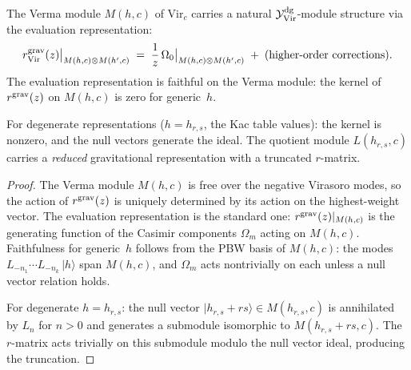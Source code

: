 \begin{proposition}
\label{prop:thqg-V-verma-gravitational}
The Verma module $M(h,c)$ of $\mathrm{Vir}_c$ carries a natural
$\mathcal{Y}^{\mathrm{dg}}_{\mathrm{Vir}}$-module structure via the evaluation
representation:
\begin{equation}\label{eq:thqg-V-verma-evaluation}
r^{\mathrm{grav}}_{\mathrm{Vir}}(z)\big|_{M(h,c) \otimes M(h',c)}
\;=\;
\frac{1}{z}\,\Omega_0\big|_{M(h,c) \otimes M(h',c)}
\;+\;
\text{(higher-order corrections)}.
\end{equation}
The evaluation representation is faithful on the Verma module:
the kernel of $r^{\mathrm{grav}}(z)$ on $M(h,c)$ is zero for generic~$h$.

For degenerate representations ($h = h_{r,s}$, the Kac table
values): the kernel is nonzero, and the null vectors
generate the ideal. The quotient module $L(h_{r,s},c)$ carries a
\emph{reduced} gravitational representation with a truncated
$r$-matrix.
\end{proposition}

\begin{proof}
The Verma module $M(h,c)$ is free over the negative Virasoro modes,
so the action of $r^{\mathrm{grav}}(z)$ is uniquely determined by its action on
the highest-weight vector. The evaluation representation is the
standard one: $r^{\mathrm{grav}}(z)|_{M(h,c)}$ is the generating function of
the Casimir components $\Omega_m$ acting on $M(h,c)$. Faithfulness
for generic~$h$ follows from the PBW basis of $M(h,c)$: the modes
$L_{-n_1} \cdots L_{-n_k}\,|h\rangle$ span $M(h,c)$, and
$\Omega_m$ acts nontrivially on each unless a null vector relation
holds.

For degenerate $h = h_{r,s}$: the null vector
$|h_{r,s} + rs\rangle \in M(h_{r,s},c)$ is annihilated by
$L_n$ for $n > 0$ and generates a submodule isomorphic to
$M(h_{r,s} + rs, c)$. The $r$-matrix acts trivially on this
submodule modulo the null vector ideal, producing the truncation.
\end{proof}

